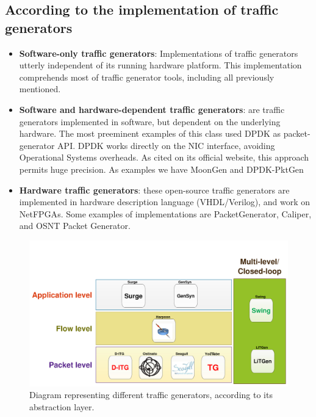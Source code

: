 \subsection{According to the implementation of traffic generators}

\begin{itemize}

\item \textbf{Software-only traffic generators}: Implementations of traffic generators utterly independent of its running hardware platform. This implementation comprehends most of traffic generator tools, including all previously mentioned. 

\item \textbf{Software and hardware-dependent traffic generators}: are traffic generators implemented in software, but dependent on the underlying hardware. The most preeminent examples of this class used DPDK\cite{web-dpdk} as packet-generator API. DPDK works directly on the \acrshort{NIC} interface, avoiding Operational Systems overheads. As cited on its official website, this approach permits huge precision. As examples we have MoonGen\cite{moongen-paper} and DPDK-PktGen\cite{web-dpdk-pktgen}

\item \textbf{Hardware traffic generators}: these open-source traffic generators are implemented in hardware description language (VHDL/Verilog), and work on \acrshort{NetFPGA}s. Some examples of implementations are PacketGenerator\cite{pktgen-netfpga-paper}, Caliper\cite{caliper-paper}, and OSNT Packet Generator\cite{osnt-paper}.

\end{itemize}


\begin{figure}[!ht]
    \centering
    \includegraphics[scale=0.4]{figures/ch2/types-workload-tools}
    \caption{Diagram representing different traffic generators, according to its abstraction layer.}
    \label{fig:layers-workload-tools}
\end{figure}





